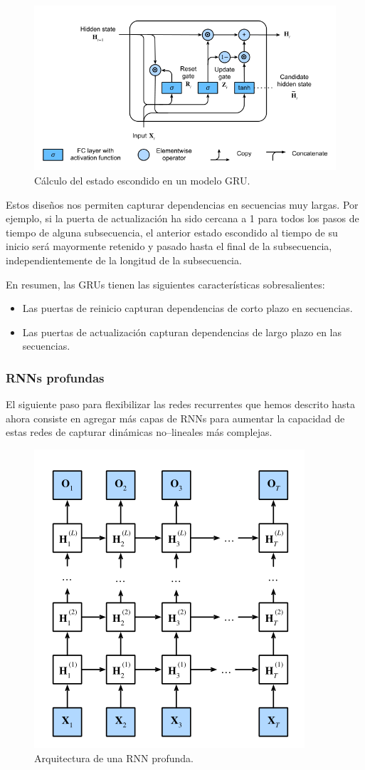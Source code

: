 \documentclass[12pt]{article}
\begin{document}
\begin{figure}
    \centering
    \includegraphics[width=0.8\linewidth]{images/gru-3}
    \caption{Cálculo del estado escondido en un modelo GRU.}
    \label{fig:gru-3}
\end{figure}

Estos diseños nos permiten capturar dependencias en secuencias muy largas. Por ejemplo, si la puerta de actualización ha sido cercana a 1 para todos los pasos de tiempo de alguna subsecuencia, el anterior estado escondido al tiempo de su inicio será mayormente retenido y pasado hasta el final de la subsecuencia, independientemente de la longitud de la subsecuencia.

En resumen, las GRUs tienen las siguientes características sobresalientes:
\begin{itemize}
    \item Las puertas de reinicio capturan dependencias de corto plazo en secuencias.
    \item Las puertas de actualización capturan dependencias de largo plazo en las secuencias.
\end{itemize}

\subsubsection{RNNs profundas}

El siguiente paso para flexibilizar las redes recurrentes que hemos descrito hasta ahora consiste en agregar más capas de RNNs para aumentar la capacidad de estas redes de capturar dinámicas no--lineales más complejas.

\begin{figure}
    \centering
    \includegraphics[width=0.5\linewidth]{images/deep-rnns}
    \caption{Arquitectura de una RNN profunda.}
    \label{fig:deep-rnns}
\end{figure}
\end{document}
